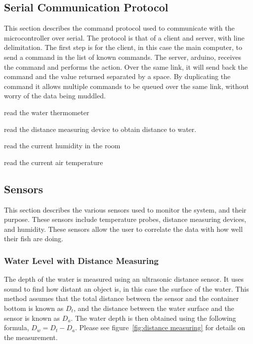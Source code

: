 \documentclass[american,man,12pt]{article}
\begin{document}
\subsection{Serial Communication Protocol}
This section describes the command protocol used to communicate with the
microcontroller over serial. The protocol is that of a client and server,
with line delimitation. The first step is for the client, in this case the
main computer, to send a command in the list of known commands. The server,
arduino, receives the command and performs the action. Over the same link, it
will send back the command and the value returned separated by a space. By
duplicating the command it allows multiple commands to be queued over the same
link, without worry of the data being muddled.

\begin{description}[style=nextline]
	\item[rWatThm] read the water thermometer
	\item[rdWaLvl] read the distance measuring device to obtain distance to water.
	\item[rdHumid] read the current humidity in the room
	\item[rdAirTm] read the current air temperature
\end{description}

\subsection{Sensors}
This section describes the various sensors used to monitor the system, and their
purpose. These sensors include temperature probes, distance measuring devices,
and humidity. These sensors allow the user to correlate the data with how well
their fish are doing.

\subsubsection{Water Level with Distance Measuring}
The depth of the water is measured using an ultrasonic distance sensor. It uses
sound to find how distant an object is, in this case the surface of the water.
This method assumes that the total distance between the sensor and the container
bottom is known as $D_t$, and the distance between the water surface and the sensor
is known as $D_a$. The water depth is then obtained using the following formula,
$D_w = D_t - D_a$. Please see figure~\ref{fig:distance measuring} for details on the
measurement.
\end{document}
